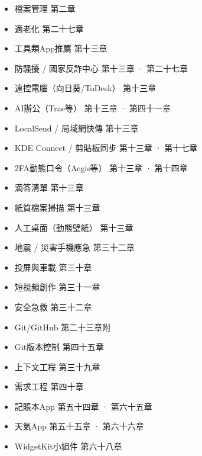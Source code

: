 
\begin{itemize}
  \item 檔案管理 第二章
  \item 適老化 第二十七章
  \item 工具類App推薦 第十三章
  \item 防騷擾 / 國家反詐中心 第十三章 · 第二十七章
  \item 遠控電腦（向日葵/ToDesk） 第十三章
  \item AI辦公（Trae等） 第十三章 · 第四十一章
  \item LocalSend / 局域網快傳 第十三章
  \item KDE Connect / 剪貼板同步 第十三章 · 第十七章
  \item 2FA動態口令（Aegis等） 第十三章 · 第十四章
  \item 滴答清單 第十三章
  \item 紙質檔案掃描 第十三章
  \item 人工桌面（動態壁紙） 第十三章
  \item 地震 / 災害手機應急 第三十二章
  \item 投屏與車載 第三十章
  \item 短視頻創作 第三十一章
  \item 安全急救 第三十二章
  \item Git/GitHub 第二十三章附
  \item Git版本控制 第四十五章
  \item 上下文工程 第三十九章
  \item 需求工程 第四十章
  \item 記賬本App 第五十四章 · 第六十五章
  \item 天氣App 第五十五章 · 第六十六章
  \item WidgetKit小組件 第六十八章
\end{itemize}
